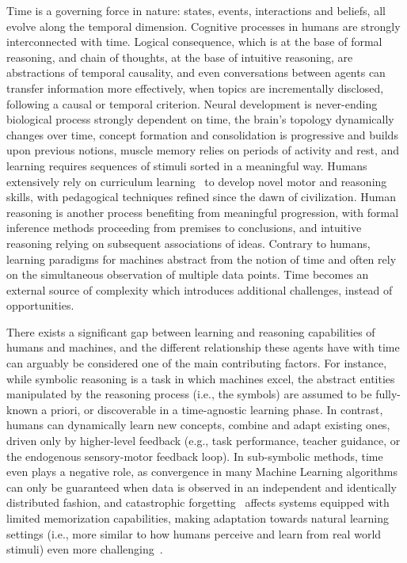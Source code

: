 
Time is a governing force in nature: states, events, interactions and beliefs, all evolve along the temporal dimension. Cognitive processes in humans are strongly interconnected with time. Logical consequence, which is at the base of formal reasoning, and chain of thoughts, at the base of intuitive reasoning, are abstractions of temporal causality, and even conversations between agents can transfer information more effectively, when topics are incrementally disclosed, following a causal or temporal criterion. 
Neural development is never-ending biological process strongly dependent on time, the brain's topology dynamically changes over time, concept formation and consolidation is progressive and builds upon previous notions, muscle memory relies on periods of activity and rest, and learning requires sequences of stimuli sorted in a meaningful way.
%
Humans extensively rely on curriculum learning~\cite{bengio2009curriculum} to develop novel motor and reasoning skills, with pedagogical techniques refined since the dawn of civilization.
%
Human reasoning is another process benefiting from meaningful progression, with formal inference methods proceeding from premises to conclusions, and intuitive reasoning relying on subsequent associations of ideas.
Contrary to humans, learning paradigms for machines abstract from the notion of time and often rely on the simultaneous observation of multiple data points. Time becomes an external source of complexity which introduces additional challenges, instead of opportunities.

There exists a significant gap between learning and reasoning capabilities of humans and machines, and the different relationship these agents have with time can arguably be considered one of the main contributing factors.
For instance, while symbolic reasoning is a task in which machines excel, the abstract entities manipulated by the reasoning process (i.e., the symbols) are assumed to be fully-known a priori, or discoverable in a time-agnostic learning phase. In contrast, humans can dynamically learn new concepts, combine and adapt existing ones, driven only by higher-level feedback (e.g., task performance, teacher guidance, or the endogenous sensory-motor feedback loop). 
In sub-symbolic methods, time even plays a negative role, as convergence in many Machine Learning algorithms can only be guaranteed when data is observed in an independent and identically distributed fashion, and catastrophic forgetting~\cite{mccloskey1989catastrophic} affects systems equipped with limited memorization capabilities, making adaptation towards natural learning settings (i.e., more similar to how humans perceive and learn from real world stimuli) even more challenging~\cite{casoni2024pitfalls}.

